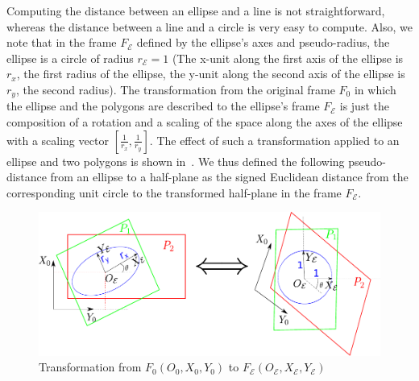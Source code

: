 
Computing the distance between an ellipse and a line is not straightforward, whereas the distance between a line and a circle is very easy to compute.
Also, we note that in the frame $F_\mathcal{E}$ defined by the ellipse's axes and pseudo-radius, the ellipse is a circle of radius $r_{\mathcal{E}}=1$ (The x-unit along the first axis of the ellipse is $r_x$, the first radius of the ellipse, the y-unit along the second axis of the ellipse is $r_y$, the second radius).
The transformation from the original frame $F_0$ in which the ellipse and the polygons are described to the ellipse's frame $F_\mathcal{E}$ is just the composition of a rotation and a scaling of the space along the axes of the ellipse with a scaling vector $[\frac{1}{r_x}, \frac{1}{r_y}]$.
The effect of such a transformation applied to an ellipse and two polygons is shown in~.
We thus defined the following pseudo-distance from an ellipse to a half-plane as the signed Euclidean distance from the corresponding unit circle to the transformed half-plane in the frame $F_\mathcal{E}$.

\begin{figure}[!htb]
  \centering
  \includegraphics[width=0.9\linewidth]{pseudo-distance.pdf}
  \caption{Transformation from $F_0(O_0, X_0, Y_0)$ to $F_\mathcal{E}(O_\mathcal{E},X_\mathcal{E},Y_\mathcal{E})$}
\label{fig:pseudo-distance}
\end{figure}

